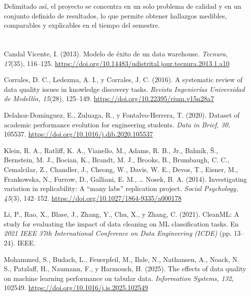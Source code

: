 \documentclass[11pt,openany,oneside,letterpaper]{book}
\makeatletter
\renewenvironment{thebibliography}[1]
  {\chapter*{\bibname}\addcontentsline{toc}{chapter}{\bibname}%
   \def\@biblabel##1{}\list{}{\usecounter{enumiv}\setlength{\leftmargin}{1.27cm}\setlength{\itemindent}{-1.27cm}%
   \setlength{\itemsep}{4pt}\setlength{\parsep}{0pt}}\sloppy}
  {\endlist}
\makeatother
\begin{document}
Delimitado así, el proyecto se concentra en un solo problema de calidad y en un conjunto definido de resultados, lo que permite obtener hallazgos medibles, comparables y explicables en el tiempo del semestre.

 \backmatter

\begin{thebibliography}{xx}

 Candal Vicente, I. (2013). Modelo de éxito de un data warehouse. \emph{Tecnura, 17}(35), 116--125. \url{https://doi.org/10.14483/udistrital.jour.tecnura.2013.1.a10}

 Corrales, D. C., Ledezma, A. I., y Corrales, J. C. (2016). A systematic review of data quality issues in knowledge discovery tasks. \emph{Revista Ingenierías Universidad de Medellín, 15}(28), 125--149. \url{https://doi.org/10.22395/rium.v15n28a7}

 Delahoz-Dominguez, E., Zuluaga, R., y Fontalvo-Herrera, T. (2020). Dataset of academic performance evolution for engineering students. \emph{Data in Brief, 30}, 105537. \url{https://doi.org/10.1016/j.dib.2020.105537}

 Klein, R. A., Ratliff, K. A., Vianello, M., Adams, R. B., Jr., Bahník, Š., Bernstein, M. J., Bocian, K., Brandt, M. J., Brooks, B., Brumbaugh, C. C., Cemalcilar, Z., Chandler, J., Cheong, W., Davis, W. E., Devos, T., Eisner, M., Frankowska, N., Furrow, D., Galliani, E. M., \ldots{} Nosek, B. A. (2014). Investigating variation in replicability: A ``many labs'' replication project. \emph{Social Psychology, 45}(3), 142--152. \url{https://doi.org/10.1027/1864-9335/a000178}

 Li, P., Rao, X., Blase, J., Zhang, Y., Chu, X., y Zhang, C. (2021). CleanML: A study for evaluating the impact of data cleaning on ML classification tasks. En \emph{2021 IEEE 37th International Conference on Data Engineering (ICDE)} (pp. 13--24). IEEE.

 Mohammed, S., Budach, L., Feuerpfeil, M., Ihde, N., Nathansen, A., Noack, N. S., Patzlaff, H., Naumann, F., y Harmouch, H. (2025). The effects of data quality on machine learning performance on tabular data. \emph{Information Systems, 132}, 102549. \url{https://doi.org/10.1016/j.is.2025.102549}
\end{thebibliography}
\end{document}
